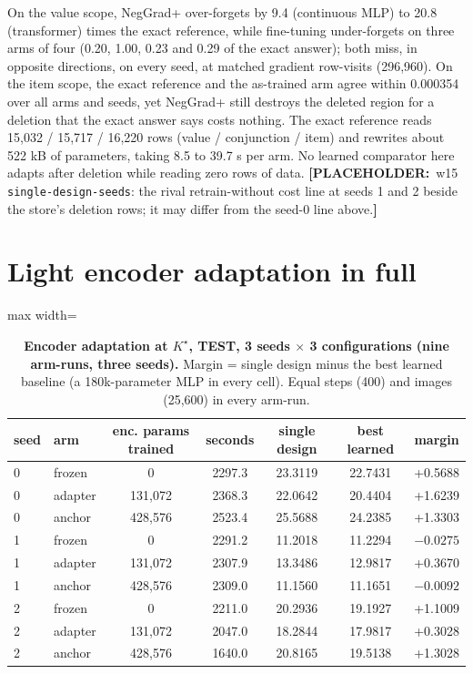 \documentclass{article} %
\newcommand{\PLACEHOLDER}[1]{{\color{red}\textbf{[PLACEHOLDER:}~#1\textbf{]}}}
\newcommand{\Kstar}{\ensuremath{K^{\star}}}
\begin{document}
\noindent On the value scope, NegGrad+ over-forgets by 9.4 (continuous MLP) to 20.8 (transformer)
times the exact reference, while fine-tuning under-forgets on three arms of four (0.20, 1.00, 0.23
and 0.29 of the exact answer); both miss, in opposite directions, on every seed, at matched gradient
row-visits (296,960). On the item scope, the exact reference and the as-trained arm agree within
0.000354 over all arms and seeds, yet NegGrad+ still destroys the deleted region for a deletion
that the exact answer says costs nothing. The exact reference reads 15,032 / 15,717 / 16,220 rows
(value / conjunction / item) and rewrites about 522 kB of parameters, taking 8.5 to 39.7 s per
arm. No learned comparator here adapts after deletion while reading zero rows of data.
\PLACEHOLDER{w15 \texttt{single-design-seeds}: the rival retrain-without cost line at seeds 1 and 2
beside the store's deletion rows; it may differ from the seed-0 line above.}

\section{Light encoder adaptation in full}
\label{app:adapt}

\begin{table}[h]
\centering\small
\caption{\textbf{Encoder adaptation at $\Kstar$, TEST, 3 seeds $\times$ 3 configurations (nine
arm-runs, three seeds).} Margin = single design minus the best learned baseline (a 180k-parameter %
MLP in every cell). Equal steps (400) and images (25,600) in every arm-run.} %
\label{tab:adapt}
\setlength{\tabcolsep}{3pt}
\begin{adjustbox}{max width=\linewidth}\begin{tabular}{llccccc}
\toprule
seed & arm & enc. params trained & seconds & single design & best learned & margin \\
\midrule
0 & frozen & 0 & 2297.3 & 23.3119 & 22.7431 & +0.5688 \\
0 & adapter & 131,072 & 2368.3 & 22.0642 & 20.4404 & +1.6239 \\
0 & anchor & 428,576 & 2523.4 & 25.5688 & 24.2385 & +1.3303 \\
1 & frozen & 0 & 2291.2 & 11.2018 & 11.2294 & $-0.0275$ \\
1 & adapter & 131,072 & 2307.9 & 13.3486 & 12.9817 & +0.3670 \\
1 & anchor & 428,576 & 2309.0 & 11.1560 & 11.1651 & $-0.0092$ \\
2 & frozen & 0 & 2211.0 & 20.2936 & 19.1927 & +1.1009 \\
2 & adapter & 131,072 & 2047.0 & 18.2844 & 17.9817 & +0.3028 \\
2 & anchor & 428,576 & 1640.0 & 20.8165 & 19.5138 & +1.3028 \\
\bottomrule
\end{tabular}\end{adjustbox}
\end{table}
\end{document}
